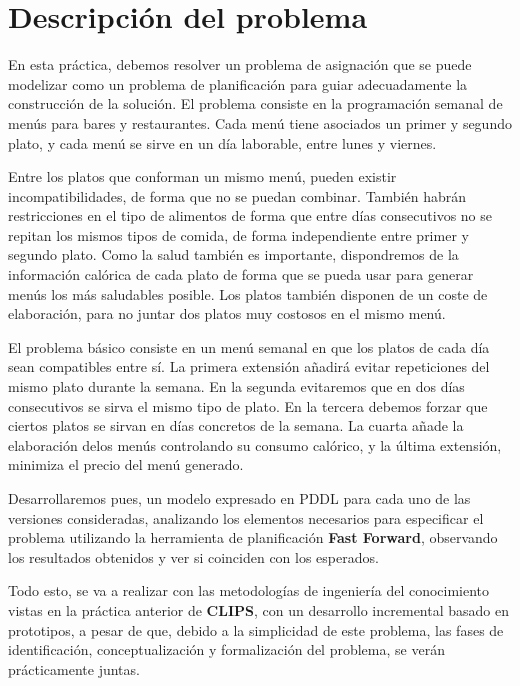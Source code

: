 \documentclass{article}
\begin{document}
\section{Descripción del problema}
En esta práctica, debemos resolver un problema de asignación que se puede modelizar como un problema de planificación para guiar adecuadamente la construcción de la solución. El problema consiste en la programación semanal de menús para bares y restaurantes. Cada menú tiene asociados un primer y segundo plato, y cada menú se sirve en un día laborable, entre lunes y viernes.
\par
Entre los platos que conforman un mismo menú, pueden existir incompatibilidades, de forma que no se puedan combinar. También habrán restricciones en el tipo de alimentos de forma que entre días consecutivos no se repitan los mismos tipos de comida, de forma independiente entre primer y segundo plato. Como la salud también es importante, dispondremos de la información calórica de cada plato de forma que se pueda usar para generar menús los más saludables posible. Los platos también disponen de un coste de elaboración, para no juntar dos platos muy costosos en el mismo menú.
\par
El problema básico consiste en un menú semanal en que los platos de cada día sean compatibles entre sí. La primera extensión añadirá evitar repeticiones del mismo plato durante la semana. En la segunda evitaremos que en dos días consecutivos se sirva el mismo tipo de plato. En la tercera debemos forzar que ciertos platos se sirvan en días concretos de la semana. La cuarta añade la elaboración delos menús controlando su consumo calórico, y la última extensión, minimiza el precio del menú generado.
\par
Desarrollaremos pues, un modelo expresado en PDDL para cada uno de las versiones consideradas, analizando los elementos necesarios para especificar el problema utilizando la herramienta de planificación \textbf{Fast Forward}, observando los resultados obtenidos y ver si coinciden con los esperados.
\par
Todo esto, se va a realizar con las metodologías de ingeniería del conocimiento vistas en la práctica anterior de \textbf{CLIPS}, con un desarrollo incremental basado en prototipos, a pesar de que, debido a la simplicidad de este problema, las fases de identificación, conceptualización y formalización del problema, se verán prácticamente juntas.
\end{document}
